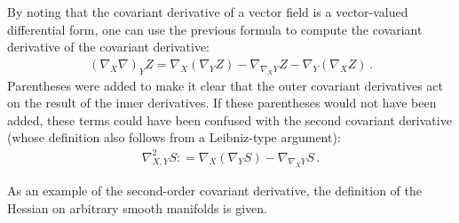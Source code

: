     \begin{result}
        By noting that the covariant derivative of a vector field is a vector-valued differential form, one can use the previous formula to compute the covariant derivative of the covariant derivative:
        \begin{gather}
            (\nabla_X\nabla)_YZ = \nabla_X(\nabla_YZ) - \nabla_{\nabla_XY}Z - \nabla_Y(\nabla_XZ)\,.
        \end{gather}
        Parentheses were added to make it clear that the outer covariant derivatives act on the result of the inner derivatives. If these parentheses would not have been added, these terms could have been confused with the second covariant derivative (whose definition also follows from a Leibniz-type argument):
        \begin{gather}
            \nabla^2_{X,Y}S : = \nabla_X(\nabla_YS) - \nabla_{\nabla_XY}S\,.
        \end{gather}
    \end{result}

    As an example of the second-order covariant derivative, the definition of the Hessian on arbitrary smooth manifolds is given.

